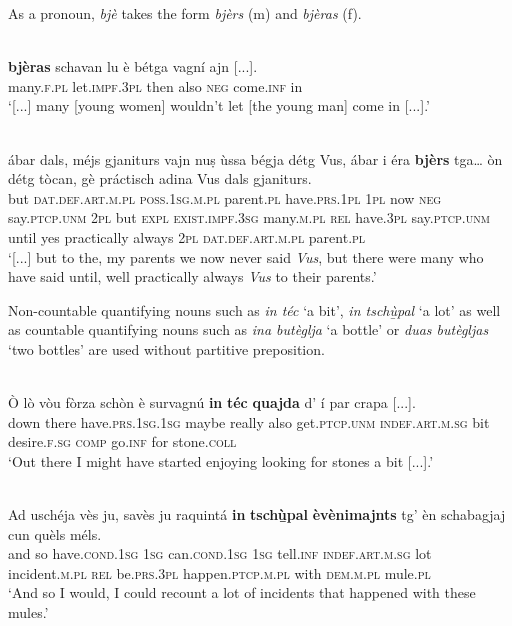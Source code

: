 As a pronoun, \textit{bjè} takes the form \textit{bjèrs} (m) and \textit{bjèras} (f).

\ea

\\
	\gll    [...] \textbf{bjèras} schavan lu è bétga vagní ajn [...].\\
{} many.\textsc{f.pl} let.\textsc{impf.3pl} then also \textsc{neg} come.\textsc{inf} in\\
\glt `[...] many [young women] wouldn’t let [the young man] come in [...].'
\z

\ea

\\
\gll  [...] ábar dals, méjs gjaniturs vajn nuṣ ùssa bégja détg Vus, ábar i éra \textbf{bjèrs} tga… òn détg tòcan, gè práctisch adina Vus dals gjaniturs.  \\
{} but \textsc{dat.def.art.m.pl} \textsc{poss.1sg.m.pl} parent.\textsc{pl} have.\textsc{prs.1pl} \textsc{1pl} now \textsc{neg} say.\textsc{ptcp.unm} \textsc{2pl} but \textsc{expl} \textsc{exist.impf.3sg}  many.\textsc{m.pl} \textsc{rel} have.\textsc{3pl} say.\textsc{ptcp.unm} until yes practically always \textsc{2pl} \textsc{dat.def.art.m.pl} parent.\textsc{pl}\\
\glt `[...] but to the, my parents we now never said \textit{Vus}, but there were many who have said until, well practically always \textit{Vus} to their parents.'
\z

Non-countable quantifying nouns such as \textit{in téc} `a bit', \textit{in tschù̱pal} `a lot' as well as countable quantifying nouns such as \textit{ina butèglja} `a bottle' or \textit{duas butègljas} `two bottles' are used without partitive preposition.

\ea

\\
\gll  Ò lò vòu fòrza schòn è survagnú \textbf{in} \textbf{téc} \textbf{quajda} d' í par crapa [...].\\
down there  have.\textsc{prs.1sg.1sg} maybe really also get.\textsc{ptcp.unm} \textsc{indef.art.m.sg} bit desire.\textsc{f.sg} \textsc{comp} go.\textsc{inf} for stone.\textsc{coll} \\
\glt `Out there I might have started enjoying looking for stones a bit [...].'
\z

\ea

\\
\gll  Ad uschéja vès ju, savès ju raquintá \textbf{in} \textbf{tschù̱pal} \textbf{èvènimajnts} tg’ èn schabagjaj cun quèls méls.\\
and so have.\textsc{cond.1sg} \textsc{1sg} can.\textsc{cond.1sg} \textsc{1sg} tell.\textsc{inf} \textsc{indef.art.m.sg} lot incident.\textsc{m.pl} \textsc{rel} be.\textsc{prs.3pl} happen.\textsc{ptcp.m.pl} with \textsc{dem.m.pl} mule.\textsc{pl}\\
\glt `And so I would, I could recount a lot of incidents that happened with these mules.'
\z

